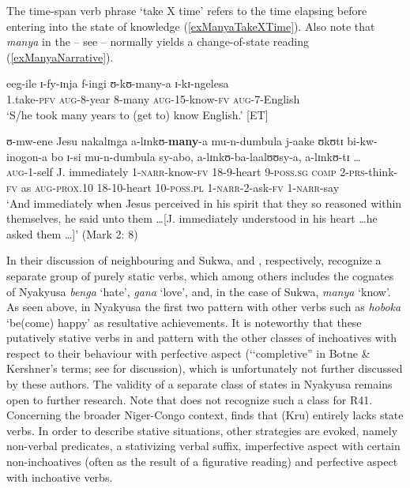 The time-span verb phrase \lq take X time' refers to the time elapsing before entering into the state of knowledge (\ref{exManyaTakeXTime}). Also note that \textit{manya} in the  -- see  -- normally yields a change-of-state reading (\ref{exManyaNarrative}).

\begin{exe}
\ex \label{exManyaTakeXTime} \gll eeg-ile ɪ-fy-ɪnja f-ingi ʊ-kʊ-many-a ɪ-kɪ-ngelesa\\
1.take-\textsc{pfv} \textsc{aug}-8-year 8-many \textsc{aug}-15-know-\textsc{fv} \textsc{aug}-7-English\\
\glt \lq S/he took many years to (get to) know English.' [ET] 

\ex \label{exManyaNarrative} \gll ʊ-mw-ene Jesu nakalɪnga a-lɪnkʊ-\textbf{many}-a mu-n-dumbula j-aake ʊkʊtɪ bi-kw-inogon-a bo ɪ-si mu-n-dumbula sy-abo, a-lɪnkʊ-ba-laalʊʊsy-a, a-lɪnkʊ-tɪ \ldots\\
\textsc{aug}-1-self J. immediately 1-\textsc{narr}-know-\textsc{fv} 18-9-heart 9-\textsc{poss.sg} \textsc{comp} 2-\textsc{prs}-think-\textsc{fv} as \textsc{aug}-\textsc{prox.10} 18-10-heart 10-\textsc{poss.pl} 1-\textsc{narr}-2-ask-\textsc{fv} 1-\textsc{narr}-say {}\\
\glt \lq And immediately when Jesus perceived in his spirit that they so reasoned within themselves, he said unto them \ldots [J. immediately understood in his heart \ldots he asked them \ldots]' (Mark 2: 8)
\end{exe}

In their discussion of neighbouring  and Sukwa, \citet{BotneR2008} and \citet{KershnerT2002}, respectively, recognize a separate group of purely static verbs, which among others includes the cognates of Nyakyusa \textit{benga} \lq hate', \textit{gana} \lq love', and, in the case of Sukwa, \textit{manya} \lq know'. As seen above, in Nyakyusa the first two pattern with other verbs such as \textit{hoboka} \lq be(come) happy' as resultative achievements. It is noteworthy that these putatively stative verbs in  and  pattern with the other classes of inchoatives with respect to their behaviour with perfective aspect (\lq\lq completive'' in Botne \& Kershner's terms; see  for discussion), which is unfortunately not further discussed by these authors. The validity of a separate class of states in Nyakyusa remains open to further research. Note that \citet{SeidelF2008} does not recognize such a class for  R41. Concerning the broader Niger-Congo context, \citet[ch. 5.4]{ToewsC2015} finds that  (Kru) entirely lacks state verbs. In order to describe stative situations, other strategies are evoked, namely non-verbal predicates, a stativizing verbal suffix, imperfective aspect with certain non-inchoatives (often as the result of a figurative reading) and perfective aspect with inchoative verbs.
